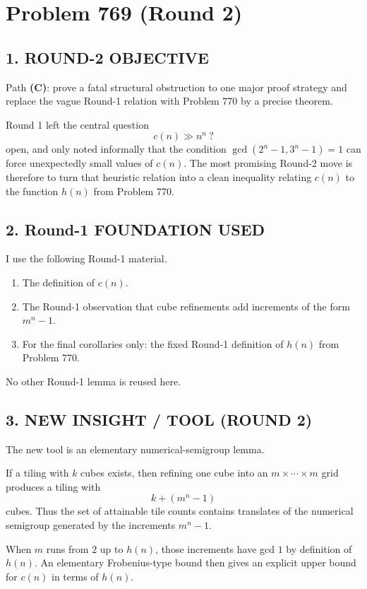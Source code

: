 
\section*{Problem 769 (Round 2)}

\subsection*{1. ROUND-2 OBJECTIVE}

Path \textbf{(C)}: prove a fatal structural obstruction to one major proof strategy and replace the vague Round-1 relation with Problem 770 by a precise theorem.

Round 1 left the central question
\[
c(n)\gg n^n \ ?
\]
open, and only noted informally that the condition $\gcd(2^n-1,3^n-1)=1$ can force unexpectedly small values of $c(n)$.
The most promising Round-2 move is therefore to turn that heuristic relation into a clean inequality relating $c(n)$ to the function $h(n)$ from Problem 770.

\subsection*{2. Round-1 FOUNDATION USED}

I use the following Round-1 material.

\begin{enumerate}
\item The definition of $c(n)$.
\item The Round-1 observation that cube refinements add increments of the form $m^n-1$.
\item For the final corollaries only: the fixed Round-1 definition of $h(n)$ from Problem 770.
\end{enumerate}

No other Round-1 lemma is reused here.

\subsection*{3. NEW INSIGHT / TOOL (ROUND 2)}

The new tool is an elementary numerical-semigroup lemma.

If a tiling with $k$ cubes exists, then refining one cube into an $m\times\cdots\times m$ grid produces a tiling with
\[
k+(m^n-1)
\]
cubes.
Thus the set of attainable tile counts contains translates of the numerical semigroup generated by the increments $m^n-1$.

When $m$ runs from $2$ up to $h(n)$, those increments have gcd $1$ by definition of $h(n)$.
An elementary Frobenius-type bound then gives an explicit upper bound for $c(n)$ in terms of $h(n)$.

